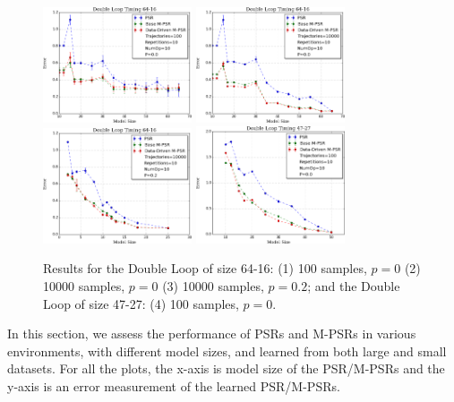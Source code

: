 \documentclass[letterpaper]{article}
\begin{document}
\begin{figure}[ht!]
\centering
\includegraphics[width=44mm]{64-16-100.png}%
\includegraphics[width=44mm]{64-16-10000.png}%
\includegraphics[width=44mm]{NoiseInfo.png}%
\includegraphics[width=44mm]{47-27-10000.png}%
\caption{Results for the Double Loop of size 64-16: (1) 100 samples, $p = 0$ (2) 10000 samples, $p = 0$ (3) 10000 samples, $p = 0.2$; and the Double Loop of size 47-27: (4) 100 samples, $p = 0$.
\label{fig-double}\vspace*{-4mm}}
\end{figure}

In this section, we assess the performance of PSRs and M-PSRs in various environments, with different model sizes, and learned from both large and small datasets. For all the plots, the x-axis is model size of the PSR/M-PSRs and the y-axis is an error measurement of the learned PSR/M-PSRs.
\end{document}
